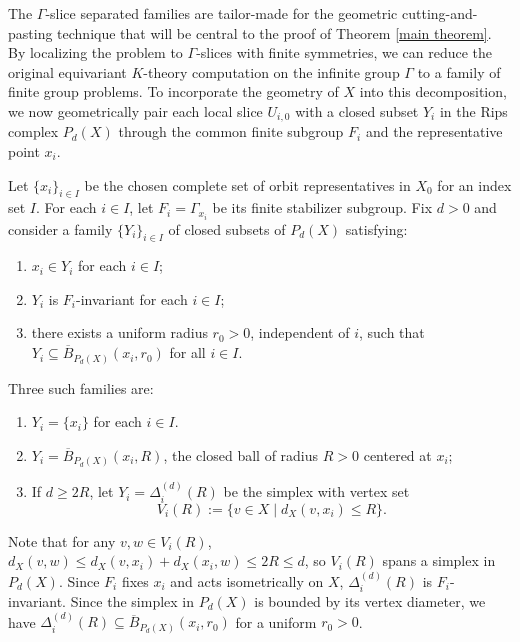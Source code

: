 \documentclass[pdflatex]{sn-jnl}
\theoremstyle{plain}
\theoremstyle{definition}
\begin{document}
The $\Gamma$-slice separated families are tailor-made for the geometric cutting-and-pasting technique that will be central to the proof of Theorem \ref{main theorem}. By localizing the problem to $\Gamma$-slices with finite symmetries, we can reduce the original equivariant $K$-theory computation on the infinite group $\Gamma$ to a family of finite group problems. To incorporate the geometry of $X$ into this decomposition, we now geometrically pair each local slice $U_{i,0}$ with a closed subset $Y_i$ in the Rips complex $P_{d}(X)$ through the common finite subgroup $F_i$ and the representative point $x_i$.

Let $\{x_i\}_{i\in I}$ be the chosen complete set of orbit representatives in $X_0$ for an index set $I$. For each $i \in I$, let $F_i=\Gamma_{x_i}$ be its finite stabilizer subgroup. Fix $d>0$ and consider a family $\{Y_i\}_{i\in I}$ of closed subsets of $P_{d}(X)$ satisfying:
\begin{enumerate}
\item[(1)] $x_i\in Y_i$ for each $i\in I$;
\item[(2)] $Y_i$ is $F_i$-invariant for each $i\in I$;
\item[(3)] there exists a uniform radius $r_0>0$, independent of $i$, such that $Y_i\subseteq \overline{B}_{P_{d}(X)}(x_i,r_0)$ for all $i\in I$.
\end{enumerate}
Three such families are:
\begin{enumerate}
\item[(a)] $Y_i=\{x_i\}$ for each $i\in I$.
\item[(b)] $Y_i=\overline{B}_{P_{d}(X)}(x_i,R)$, the closed ball of radius $R > 0$ centered at $x_i$;
\item[(c)] If $d \geq 2R$, 
let $Y_i=\Delta_i^{(d)}(R)$ be the simplex with vertex set $$V_i(R):=\{v\in X\mid d_X(v,x_i)\leq R\}.$$ 
\end{enumerate}
Note that for any $v,w\in V_i(R)$, $d_X(v,w)\leq d_X(v, x_i)+d_X(x_i,w)\leq 2R\leq d$, so $V_i(R)$ spans a simplex in $P_{d}(X)$. Since $F_i$ fixes $x_i$ and acts isometrically on $X$, $\Delta_i^{(d)}(R)$ is $F_i$-invariant. Since the simplex in $P_{d}(X)$ is bounded by its vertex diameter, we have $\Delta_i^{(d)}(R)\subseteq \overline{B}_{P_{d}(X)}(x_i,r_0)$ for a uniform $r_0>0$.
\end{document}
